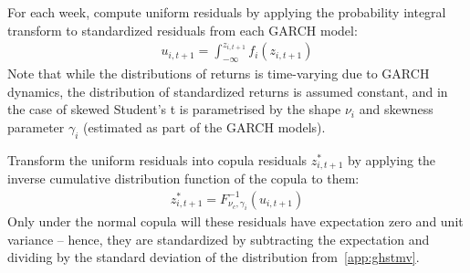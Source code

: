 For each week, compute uniform residuals by applying the probability integral transform to standardized residuals from each GARCH model:
\begin{align}
  u_{i, t+1} = \int_{-\infty}^{z_{i,t+1}} f_{i}(z_{i,t+1})
\end{align}
Note that while the distributions of returns is time-varying due to GARCH dynamics, the distribution of standardized returns is assumed constant, and in the case of skewed Student's t is parametrised by the shape $\nu_i$ and skewness parameter $\gamma_i$ (estimated as part of the GARCH models).

Transform the uniform residuals into copula residuals $z_{i,t+1}^*$ by applying the inverse cumulative distribution function of the copula to them:
\begin{align}
  z_{i,t+1}^* = F_{\nu_c,\gamma_i}^{-1}(u_{i,t+1})
\end{align}
Only under the normal copula will these residuals have expectation zero and unit variance -- hence, they are standardized by subtracting the expectation and dividing by the standard deviation of the distribution from~\autoref{app:ghstmv}.

